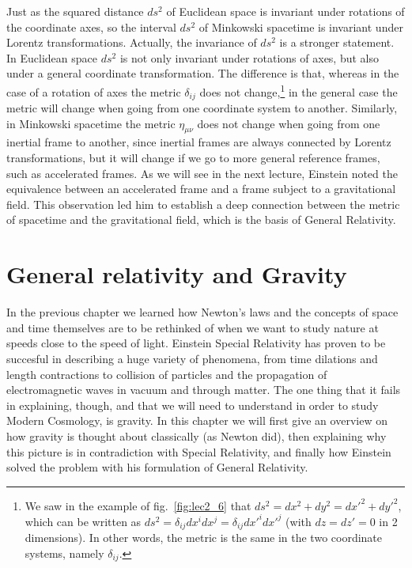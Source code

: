 \documentclass[11pt, a4paper,oneside,openright]{book}
\numberwithin{equation}{section}
\begin{document}
Just as the squared distance $ds^2$ of Euclidean space is invariant under rotations of the coordinate axes, so the interval $ds^2$ of Minkowski spacetime is invariant under Lorentz transformations. Actually, the invariance of $ds^2$ is a stronger statement. In Euclidean space $ds^2$ is not only invariant under rotations of axes, but also under a general coordinate transformation. The difference is that, whereas in the case of a rotation of axes the metric $\delta_{ij}$ does not change,\footnote{We saw in the example of fig.\ \ref{fig:lec2_6} that $ds^2=dx^2+dy^2=dx'^2+dy'^2$, which can be written as $ds^2=\delta_{ij}dx^idx^j=\delta_{ij}dx'^idx'^j$ (with $dz=dz'=0$ in 2 dimensions). In other words, the metric is the same in the two coordinate systems, namely $\delta_{ij}$.} in the general case the metric will change when going from one coordinate system to another. Similarly, in Minkowski spacetime the metric $\eta_{\mu\nu}$ does not change when going from one inertial frame to another, since inertial frames 
are always connected by Lorentz transformations, but it will change if we go to more general reference frames, such as accelerated frames. As we will see in the next lecture, Einstein noted the equivalence between an accelerated frame and a frame subject to a gravitational field. This observation led him to establish a deep connection between the metric of spacetime and the gravitational field, which is the basis of General Relativity.


\chapter{General relativity and Gravity}

In the previous chapter we learned how Newton's laws and the concepts of space and time themselves are to be rethinked of when we want to study nature at speeds close to the speed of light. Einstein Special Relativity has proven to be succesful in describing a huge variety of phenomena, from time dilations and length contractions to collision of particles and the propagation of electromagnetic waves in vacuum and through matter. The one thing that it fails in explaining, though, and that we will need to understand in order to study Modern Cosmology, is gravity. In this chapter we will first give an overview on how gravity is thought about classically (as Newton did), then explaining why this picture is in contradiction with Special Relativity, and finally how Einstein solved the problem with his formulation of General Relativity.
\end{document}
